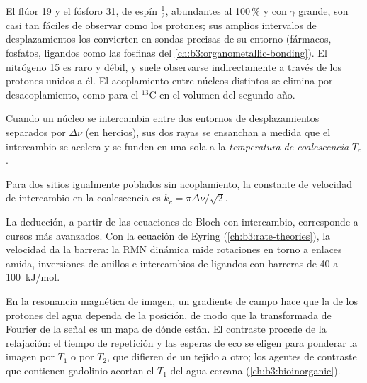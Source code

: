 El flúor 19 y el fósforo 31, de espín $\frac12$, abundantes al 100\,\% y con $\gamma$
grande, son casi tan fáciles de observar como los protones; sus amplios intervalos de desplazamientos los convierten
en sondas precisas de su entorno (fármacos, fosfatos, ligandos como las
fosfinas del \cref{ch:b3:organometallic-bonding}). El nitrógeno 15 es raro y
débil, y suele observarse indirectamente a través de los protones unidos a él.
El acoplamiento entre núcleos distintos se elimina por desacoplamiento, como para el ${}^{13}$C en
el volumen del segundo año.

\begin{definition}\label{def:b3:advanced-nmr:coalescence}
Cuando un núcleo se intercambia entre dos entornos de desplazamientos separados por
$\Delta\nu$ (en hercios), sus dos rayas se ensanchan a medida que el intercambio se acelera y se funden
en una sola a la \emph{temperatura de coalescencia}
$T_c$.
\end{definition}

\begin{proposition}\label{prop:b3:advanced-nmr:coalescence}
Para dos sitios igualmente poblados sin acoplamiento, la constante de velocidad de intercambio en
la coalescencia es $k_c = \pi\Delta\nu/\sqrt2$.
\end{proposition}
\admitted

La deducción, a partir de las ecuaciones de Bloch con intercambio, corresponde a cursos más
avanzados. Con la ecuación de Eyring (\cref{ch:b3:rate-theories}), la velocidad
da la barrera: la RMN dinámica mide rotaciones en torno a enlaces amida, inversiones de
anillos e intercambios de ligandos con barreras de 40 a \qty{100}{kJ/mol}.

\begin{example}\label{ex:b3:advanced-nmr:mri}
En la resonancia magnética de imagen, un gradiente de campo hace que la  de
los protones del agua dependa de la posición, de modo que la transformada de Fourier de la
señal es un mapa de dónde están. El contraste procede de la relajación: el
tiempo de repetición y las esperas de eco se eligen para ponderar la imagen por $T_1$ o por
$T_2$, que difieren de un tejido a otro; los agentes de contraste que contienen gadolinio
acortan el $T_1$ del agua cercana (\cref{ch:b3:bioinorganic}).
\end{example}

